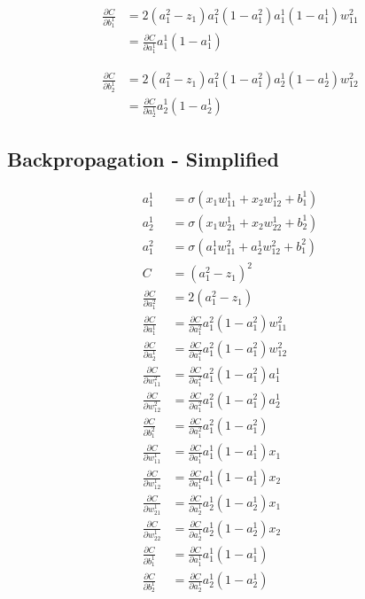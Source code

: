 \documentclass{article}
\begin{document}
\begin{align*}
\frac{\partial C}{\partial b^1_1} &= 2 (a^2_1 - z_1) a^2_1(1 - a^2_1)a^1_1(1 - a^1_1)w^2_{11}\\
&= \frac{\partial C}{\partial a^1_1} a^1_1 (1 - a^1_1)
\end{align*}

\begin{align*}
\frac{\partial C}{\partial b^1_2} &= 2 (a^2_1 - z_1) a^2_1(1 - a^2_1)a^1_2(1 - a^1_2)w^2_{12}\\
&= \frac{\partial C}{\partial a^1_2} a^1_2 (1 - a^1_2)
\end{align*}

\subsection{Backpropagation - Simplified}

\begin{align*}
a^1_1 &= \sigma(x_1 w^1_{11} + x_2 w^1_{12} + b^1_1)\\
a^1_2 &= \sigma(x_1 w^1_{21} + x_2 w^1_{22} + b^1_2)\\
a^2_1 &= \sigma(a^1_1 w^2_{11} + a^1_2 w^2_{12} + b^2_1)\\
%
C &= (a^2_1 - z_1)^2\\
%
\frac{\partial C}{\partial a^2_1} &= 2 (a^2_1 - z_1)\\
%
\frac{\partial C}{\partial a^1_1} &= \frac{\partial C}{\partial a^2_1} a^2_1 (1 - a^2_1) w^2_{11}\\
%
\frac{\partial C}{\partial a^1_2} &= \frac{\partial C}{\partial a^2_1} a^2_1 (1 - a^2_1) w^2_{12}\\
%
\frac{\partial C}{\partial w^2_{11}} &= \frac{\partial C}{\partial a^2_1} a^2_1(1 - a^2_1)a^1_1\\
%
\frac{\partial C}{\partial w^2_{12}} &= \frac{\partial C}{\partial a^2_1} a^2_1(1 - a^2_1)a^1_2\\
%
\frac{\partial C}{\partial b^2_{1}} &= \frac{\partial C}{\partial a^2_1} a^2_1(1 - a^2_1)\\
%
\frac{\partial C}{\partial w^1_{11}} &= \frac{\partial C}{\partial a^1_1} a^1_1 (1 - a^1_1) x_1\\
%
\frac{\partial C}{\partial w^1_{12}} &= \frac{\partial C}{\partial a^1_1} a^1_1 (1 - a^1_1) x_2\\
%
\frac{\partial C}{\partial w^1_{21}} &= \frac{\partial C}{\partial a^1_2} a^1_2 (1 - a^1_2) x_1\\
%
\frac{\partial C}{\partial w^1_{22}} &= \frac{\partial C}{\partial a^1_2} a^1_2 (1 - a^1_2) x_2\\
%
\frac{\partial C}{\partial b^1_1} &= \frac{\partial C}{\partial a^1_1} a^1_1 (1 - a^1_1)\\
%
\frac{\partial C}{\partial b^1_2} &= \frac{\partial C}{\partial a^1_2} a^1_2 (1 - a^1_2)\\
\end{align*}
\end{document}
